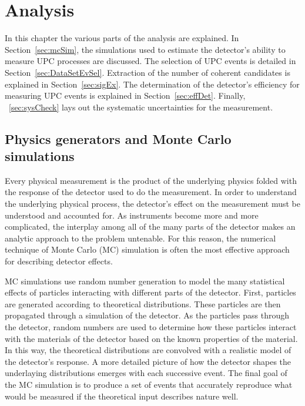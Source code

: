 \chapter{\label{ch:analysis}Analysis}
  In this chapter the various parts of the analysis are explained. 
  In Section~\ref{sec:mcSim}, the simulations used to estimate the detector's 
    ability to measure UPC processes are discussed. 
  The selection of UPC events is detailed in Section~\ref{sec:DataSetEvSel}.
  Extraction of the number of coherent \JPsi{} candidates is explained in 
    Section~\ref{sec:sigEx}.
  The determination of the detector's efficiency for measuring UPC events is 
    explained in Section~\ref{sec:effDet}.
  Finally, \DIFdelbegin {}\DIFdelend \DIFaddbegin {}\DIFaddend ~\ref{sec:sysCheck} lays out the systematic uncertainties 
    for the measurement. 

  \section{\label{sec:mcSim} Physics generators and Monte Carlo simulations}
    Every physical measurement is the product of the underlying physics 
      folded with the response of the detector used to do the measurement. 
    In order to understand the underlying physical process, the detector's 
      effect on the measurement must be understood and accounted for. 
    As instruments become more and more complicated, the interplay among all
      of the many parts of the detector makes an analytic approach to the 
      problem untenable.
    For this reason, the numerical technique of Monte Carlo (MC) simulation is
      often the most effective approach for describing detector effects.

    MC simulations use random number generation to model the many statistical 
      effects of particles interacting with different parts of the detector. 
    First, particles are generated according to theoretical distributions.
    These particles are then propagated through a simulation of the detector.
    As the particles pass through the detector, random numbers are used
      to determine how these particles interact with the materials of the 
      detector based on the known properties of the material. 
    In this way, the theoretical distributions are convolved with a realistic 
      model of the detector's response. 
    A more detailed picture of how the detector shapes the underlaying 
      distributions emerges with each successive event.
    The final goal of the MC simulation is to produce a set of events that 
      accurately reproduce what would be measured if the theoretical input 
      describes nature well. 

